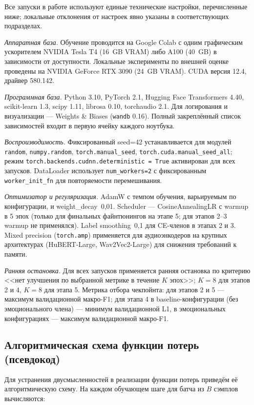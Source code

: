 \documentclass[a4paper, 12pt, oneside, openany]{article}
\begin{document}
Все запуски в работе используют единые технические настройки, перечисленные ниже; локальные отклонения от настроек явно указаны в соответствующих подразделах.

\textit{Аппаратная база.} Обучение проводится на Google Colab с одним графическим ускорителем NVIDIA Tesla T4 (16~GB VRAM) либо A100 (40~GB) в зависимости от доступности. Локальные эксперименты по внешней оценке проведены на NVIDIA GeForce RTX 3090 (24~GB VRAM). CUDA версия 12.4, драйвер 580.142.

\textit{Программная база.} Python 3.10, PyTorch 2.1, Hugging Face Transformers 4.40, scikit-learn 1.3, scipy 1.11, librosa 0.10, torchaudio 2.1. Для логирования и визуализации --- Weights \& Biases (\texttt{wandb} 0.16). Полный закреплённый список зависимостей входит в первую ячейку каждого ноутбука.

\textit{Воспроизводимость.} Фиксированный seed=42 устанавливается для модулей \texttt{random}, \texttt{numpy.random}, \texttt{torch.manual\_seed}, \texttt{torch.cuda.manual\_seed\_all}; режим \texttt{torch.backends.cudnn.deterministic = True} активирован для всех запусков. DataLoader использует \texttt{num\_workers=2} с фиксированным \texttt{worker\_init\_fn} для повторяемости перемешивания.

\textit{Оптимизатор и регуляризация.} AdamW с темпом обучения, варьируемым по конфигурации, и weight\_decay~0,01. Scheduler --- CosineAnnealingLR с warmup в 5 эпох (только для финальных файнтюнингов на этапе 5; для этапов 2--3 warmup не применялся). Label smoothing~0,1 для CE-членов в этапах 2 и 3. Mixed precision (\texttt{torch.amp}) применяется для аудиоэнкодеров на крупных архитектурах (HuBERT-Large, Wav2Vec2-Large) для снижения требований к памяти.

\textit{Ранняя остановка.} Для всех запусков применяется ранняя остановка по критерию <<нет улучшения по выбранной метрике в течение $K$ эпох>>; $K=8$ для этапов 2 и 4, $K=8$ для этапа 5. Метрика отбора чекпойнта: для этапов 2 и 5 --- максимум валидационной макро-F1; для этапа 4 в baseline-конфигурации (без эмоционального члена) --- минимум валидационной L1, в эмоциональных конфигурациях --- максимум валидационной макро-F1.

\subsection{Алгоритмическая схема функции потерь (псевдокод)}

Для устранения двусмысленностей в реализации функции потерь приведём её алгоритмическую схему. На каждом обучающем шаге для батча из $B$ сэмплов вычисляются:
\end{document}
